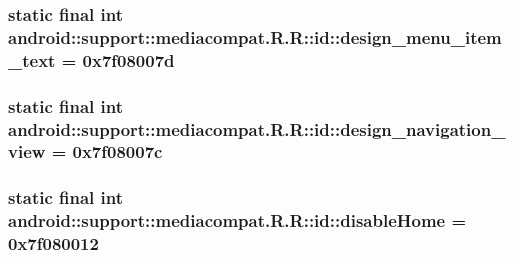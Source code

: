 \hypertarget{classandroid_1_1support_1_1mediacompat_1_1_r_1_1id_86359bbce64f508595ab526eb1746577}{
\subsubsection[{design\_\-menu\_\-item\_\-text}]{\setlength{\rightskip}{0pt plus 5cm}static final int android::support::mediacompat.R.R::id::design\_\-menu\_\-item\_\-text = 0x7f08007d}}
\label{classandroid_1_1support_1_1mediacompat_1_1_r_1_1id_86359bbce64f508595ab526eb1746577}


\hypertarget{classandroid_1_1support_1_1mediacompat_1_1_r_1_1id_d568344a39b3c07f651527a3d25084d1}{
\subsubsection[{design\_\-navigation\_\-view}]{\setlength{\rightskip}{0pt plus 5cm}static final int android::support::mediacompat.R.R::id::design\_\-navigation\_\-view = 0x7f08007c}}
\label{classandroid_1_1support_1_1mediacompat_1_1_r_1_1id_d568344a39b3c07f651527a3d25084d1}


\hypertarget{classandroid_1_1support_1_1mediacompat_1_1_r_1_1id_ca5f210711cd675ee5afd3cff799e5da}{
\subsubsection[{disableHome}]{\setlength{\rightskip}{0pt plus 5cm}static final int android::support::mediacompat.R.R::id::disableHome = 0x7f080012}}
\label{classandroid_1_1support_1_1mediacompat_1_1_r_1_1id_ca5f210711cd675ee5afd3cff799e5da}


